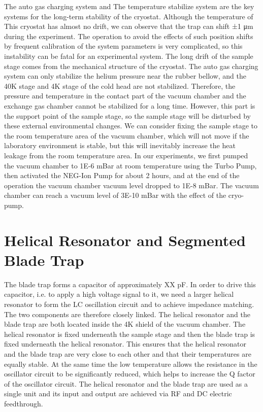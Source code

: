 The auto gas charging system and The temperature stabilize system are the key systems for the long-term stability of the cryostat. Although the temperature of This cryostat has almost no drift, we can observe that the trap can shift ±1 μm during the experiment. The operation to avoid the effects of such position shifts by frequent calibration of the system parameters is very complicated, so this instability can be fatal for an experimental system. The long drift of the sample stage comes from the mechanical structure of the cryostat. The auto gas charging system can only stabilize the helium pressure near the rubber bellow, and the 40K stage and 4K stage of the cold head are not stabilized. Therefore, the pressure and temperature in the contact part of the vacuum chamber and the exchange gas chamber cannot be stabilized for a long time. However, this part is the support point of the sample stage, so the sample stage will be disturbed by these external environmental changes. We can consider fixing the sample stage to the room temperature area of the vacuum chamber, which will not move if the laboratory environment is stable, but this will inevitably increase the heat leakage from the room temperature area. In our experiments, we first pumped the vacuum chamber to 1E-6 mBar at room temperature using the Turbo Pump, then activated the NEG-Ion Pump for about 2 hours, and at the end of the operation the vacuum chamber vacuum level dropped to 1E-8 mBar. The vacuum chamber can reach a vacuum level of 3E-10 mBar with the effect of the cryo-pump.



\section{Helical Resonator and Segmented Blade Trap}

The blade trap forms a capacitor of approximately XX pF. In order to drive this capacitor, i.e. to apply a high voltage signal to it, we need a larger helical resonator to form the LC oscillation circuit and to achieve impedance matching. The two components are therefore closely linked. The helical resonator and the blade trap are both located inside the 4K shield of the vacuum chamber. The helical resonator is fixed underneath the sample stage and then the blade trap is fixed underneath the helical resonator. This ensures that the helical resonator and the blade trap are very close to each other and that their temperatures are equally stable. At the same time the low temperature allows the resistance in the oscillator circuit to be significantly reduced, which helps to increase the Q factor of the oscillator circuit. The helical resonator and the blade trap are used as a single unit and its input and output are achieved via RF and DC electric feedthrough.

